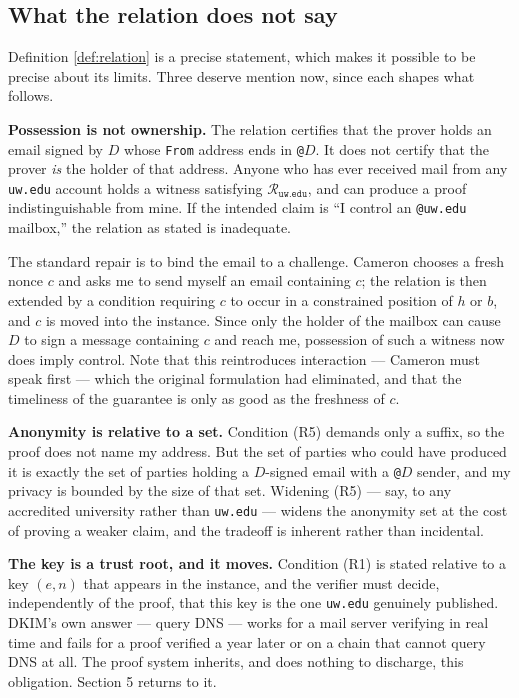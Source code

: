 \documentclass[12pt,reqno]{amsart}
\theoremstyle{definition}
\newcommand{\cR}{\mathcal{R}}
\begin{document}
\subsection{What the relation does not say}
 
Definition \ref{def:relation} is a precise statement, which makes it possible to
be precise about its limits. Three deserve mention now, since each shapes what
follows.
 
\medskip
\noindent\textbf{Possession is not ownership.} The relation certifies that the
prover holds an email signed by $D$ whose \texttt{From} address ends in
\texttt{@}$D$. It does not certify that the prover \emph{is} the holder of that
address. Anyone who has ever received mail from any \texttt{uw.edu} account holds
a witness satisfying $\cR_{\texttt{uw.edu}}$, and can produce a proof
indistinguishable from mine. If the intended claim is ``I control an
\texttt{@uw.edu} mailbox,'' the relation as stated is inadequate.
 
The standard repair is to bind the email to a challenge. Cameron chooses a fresh
nonce $c$ and asks me to send myself an email containing $c$; the relation is
then extended by a condition requiring $c$ to occur in a constrained position of
$h$ or $b$, and $c$ is moved into the instance. Since only the holder of the
mailbox can cause $D$ to sign a message containing $c$ and reach me, possession
of such a witness now does imply control. Note that this reintroduces
interaction --- Cameron must speak first --- which the original formulation had
eliminated, and that the timeliness of the guarantee is only as good as the
freshness of $c$.
 
\medskip
\noindent\textbf{Anonymity is relative to a set.} Condition (R5) demands only a
suffix, so the proof does not name my address. But the set of parties who could
have produced it is exactly the set of parties holding a $D$-signed email with a
\texttt{@}$D$ sender, and my privacy is bounded by the size of that set. Widening
(R5) --- say, to any accredited university rather than \texttt{uw.edu} --- widens
the anonymity set at the cost of proving a weaker claim, and the tradeoff is
inherent rather than incidental.
 
\medskip
\noindent\textbf{The key is a trust root, and it moves.} Condition (R1) is
stated relative to a key $(e,n)$ that appears in the instance, and the verifier
must decide, independently of the proof, that this key is the one
\texttt{uw.edu} genuinely published. DKIM's own answer --- query DNS --- works for
a mail server verifying in real time and fails for a proof verified a year later
or on a chain that cannot query DNS at all. The proof system inherits, and does
nothing to discharge, this obligation. Section 5 returns to it.
\end{document}
